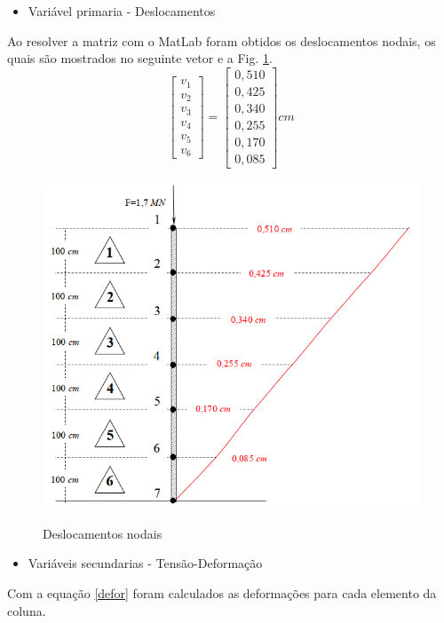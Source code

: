 \documentclass{article} %
\begin{document}
\begin{itemize}
	\item Variável primaria - Deslocamentos
\end{itemize}

\indent Ao resolver a matriz com o MatLab foram obtidos os deslocamentos nodais, os quais são mostrados no seguinte vetor e a Fig. \ref{deslocamentos}.
\begin{equation*}
\begin{bmatrix}
v_1\\
v_2\\
v_3\\
v_4\\
v_5\\
v_6
\end{bmatrix}=\begin{bmatrix}
0,510\\
0,425\\
0,340\\
0,255\\
0,170\\
0,085
\end{bmatrix}cm
\end{equation*}


\begin{figure}[H]
	\centering
	\caption{Deslocamentos nodais}
	\includegraphics[width=0.7\linewidth]{deslocamentos}	
	\label{deslocamentos}	
\end{figure}

\begin{itemize}
	\item Variáveis secundarias - Tensão-Deformação
\end{itemize}
\indent Com a equação \ref{defor} foram calculados as deformações para cada elemento da coluna.
\end{document}
